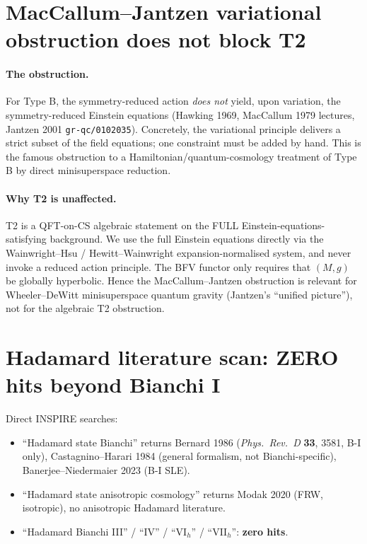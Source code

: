 \documentclass[11pt,a4paper]{article}
\begin{document}
\section{MacCallum--Jantzen variational obstruction does not block T2}

\paragraph{The obstruction.} For Type B, the symmetry-reduced action
\emph{does not} yield, upon variation, the symmetry-reduced Einstein
equations (Hawking 1969, MacCallum 1979 lectures, Jantzen 2001
\texttt{gr-qc/0102035}). Concretely, the variational principle delivers
a strict subset of the field equations; one constraint must be added by
hand. This is the famous obstruction to a Hamiltonian/quantum-cosmology
treatment of Type B by direct minisuperspace reduction.

\paragraph{Why T2 is unaffected.} T2 is a QFT-on-CS algebraic statement
on the FULL Einstein-equations-satisfying background. We use the full
Einstein equations directly via the Wainwright--Hsu / Hewitt--Wainwright
expansion-normalised system, and never invoke a reduced action
principle. The BFV functor only requires that $(M,g)$ be globally
hyperbolic. Hence the MacCallum--Jantzen obstruction is relevant for
Wheeler--DeWitt minisuperspace quantum gravity (Jantzen's ``unified
picture''), not for the algebraic T2 obstruction.

\section{Hadamard literature scan: ZERO hits beyond Bianchi I}

Direct INSPIRE searches:
\begin{itemize}
\item ``Hadamard state Bianchi'' returns Bernard 1986 (\textit{Phys.\
Rev.\ D} \textbf{33}, 3581, B-I only), Castagnino--Harari 1984 (general
formalism, not Bianchi-specific), Banerjee--Niedermaier 2023 (B-I SLE).
\item ``Hadamard state anisotropic cosmology'' returns Modak 2020 (FRW,
isotropic), no anisotropic Hadamard literature.
\item ``Hadamard Bianchi III'' / ``IV'' / ``VI$_h$'' / ``VII$_h$'':
\textbf{zero hits}.
\end{itemize}
\end{document}
